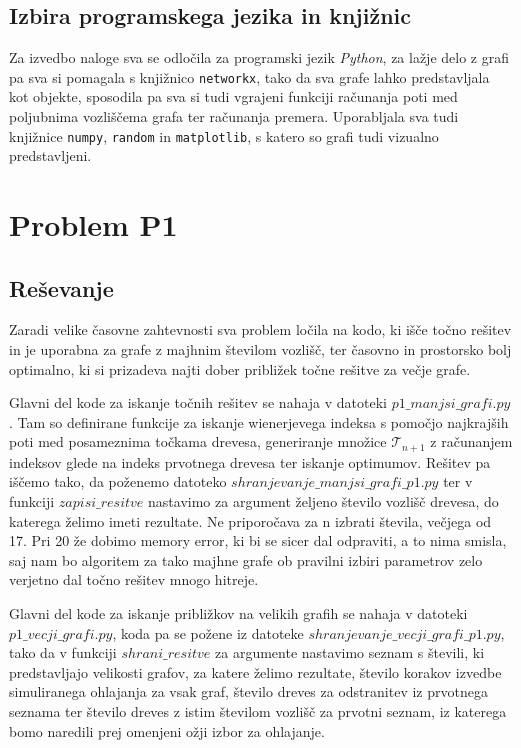 \documentclass[a4paper, 12 pt]{article}
\begin{document}
\subsection{Izbira programskega jezika in knjižnic}

Za izvedbo naloge sva se odločila za programski jezik \textit{Python}, za lažje delo z grafi pa sva si pomagala s knjižnico \texttt{networkx}, tako da sva grafe lahko predstavljala kot objekte, sposodila pa sva si tudi vgrajeni funkciji računanja poti med poljubnima vozliščema grafa ter računanja premera. Uporabljala sva tudi knjižnice \texttt{numpy}, \texttt{random} in \texttt{matplotlib}, s katero so grafi tudi vizualno predstavljeni.



\pagebreak

\section{Problem P1}

\subsection{Reševanje}

Zaradi velike časovne zahtevnosti sva problem ločila na kodo, ki išče točno rešitev in je uporabna za grafe z majhnim številom vozlišč, ter časovno in prostorsko bolj optimalno, ki si prizadeva najti dober približek točne rešitve za večje grafe.
\vspace{0.5cm}

Glavni del kode za iskanje točnih rešitev se nahaja v datoteki $p1\_manjsi\_grafi.py$. Tam so definirane funkcije za iskanje wienerjevega indeksa s pomočjo najkrajših poti med posameznima točkama drevesa, generiranje množice $\mathscr{T}_{n+1}$  z računanjem indeksov glede na indeks prvotnega drevesa ter iskanje optimumov. Rešitev pa iščemo tako, da poženemo datoteko $shranjevanje\_manjsi\_grafi\_p1.py$ ter v funkciji $zapisi\_resitve$ nastavimo za argument željeno število vozlišč drevesa, do katerega želimo imeti rezultate. Ne priporočava za n izbrati števila, večjega od 17. Pri 20 že dobimo memory error, ki bi se sicer dal odpraviti, a to nima smisla, saj nam bo algoritem za tako majhne grafe ob pravilni izbiri parametrov zelo verjetno dal točno rešitev mnogo hitreje.
\vspace{0.5cm}

Glavni del kode za iskanje približkov na velikih grafih se nahaja v datoteki $p1\_vecji\_grafi.py$, koda pa se požene iz datoteke $shranjevanje\_vecji\_grafi\_p1.py$, tako da v funkciji $shrani\_resitve$ za argumente nastavimo seznam s števili, ki predstavljajo velikosti grafov, za katere želimo rezultate, število korakov izvedbe simuliranega ohlajanja za vsak graf, število dreves za odstranitev iz prvotnega seznama ter število dreves z istim številom vozlišč za prvotni seznam, iz katerega bomo naredili prej omenjeni ožji izbor za ohlajanje.
\vspace{0.5cm}
\end{document}
